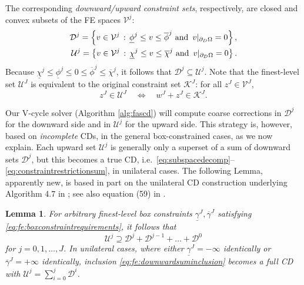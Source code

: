\documentclass[letterpaper,final,12pt,reqno]{amsart}
\theoremstyle{cstyle}
\newtheorem{lemma}[theorem]{Lemma}
\theoremstyle{cstyle*}
\theoremstyle{dstyle}
\numberwithin{equation}{section}
\numberwithin{figure}{section}
\numberwithin{table}{section}
\numberwithin{theorem}{section}
\begin{document}
The corresponding \emph{downward/upward constraint sets}, respectively, are closed and convex subsets of the FE spaces $\mathcal{V}^j$:
\begin{align}
\mathcal{D}^j = \left\{v \in \mathcal{V}^j \,:\, \underline{\phi}^j \le v \le \overline{\phi}^j \text{ and } \, v|_{\partial_D\Omega} = 0\right\}, \label{eq:fe:constraintsets} \\
\mathcal{U}^j = \left\{v \in \mathcal{V}^j \,:\, \underline{\chi}^j \le v \le \overline{\chi}^j \text{ and } \, v|_{\partial_D\Omega} = 0\right\}. \notag
\end{align}
Because $\underline{\chi}^j \le \underline{\phi}^j \le 0 \le \overline{\phi}^j \le \overline{\chi}^j$, it follows that $\mathcal{D}^j \subseteq \mathcal{U}^j$.  Note that the finest-level set $\mathcal{U}^J$ is equivalent to the original constraint set $\mathcal{K}^J$: for all $z^J \in \mathcal{V}^J$,
\begin{equation}
z^J \in \mathcal{U}^J \quad \iff \quad w^J+z^J \in \mathcal{K}^J. \label{eq:fe:finestlevelequivalent}
\end{equation}

Our V-cycle solver (Algorithm \ref{alg:fascd}) will compute coarse corrections in $\mathcal{D}^j$ for the downward side and in $\mathcal{U}^j$ for the upward side.  This strategy is, however, based on \emph{incomplete} CDs, in the general box-constrained cases, as we now explain.  Each upward set $\mathcal{U}^j$ is generally only a superset of a sum of downward sets $\mathcal{D}^j$, but this becomes a true CD, i.e.~\eqref{eq:subspacedecomp}--\eqref{eq:constraintrestrictionsum}, in unilateral cases.  The following Lemma, apparently new, is based in part on the unilateral CD construction underlying Algorithm 4.7 in \cite{GraeserKornhuber2009}; see also equation (59) in \cite{Tai2003}.

\begin{lemma}  \label{lem:downwardadmissibility}  For arbitrary finest-level box constraints $\underline{\gamma}^J,\overline{\gamma}^J$ satisfying \eqref{eq:fe:boxconstraintrequirements}, it follows that
\begin{equation}
\mathcal{U}^j \supseteq \mathcal{D}^j + \mathcal{D}^{j-1} + \dots + \mathcal{D}^0 \label{eq:fe:downwardsuminclusion}
\end{equation}
for $j=0,1,\dots,J$.  In unilateral cases, where either $\underline{\gamma}^J=-\infty$ identically or $\overline{\gamma}^J=+\infty$ identically, inclusion \eqref{eq:fe:downwardsuminclusion} becomes a full CD with $\mathcal{U}^j=\sum_{i=0}^j \mathcal{D}^i$.
\end{lemma}
\end{document}
